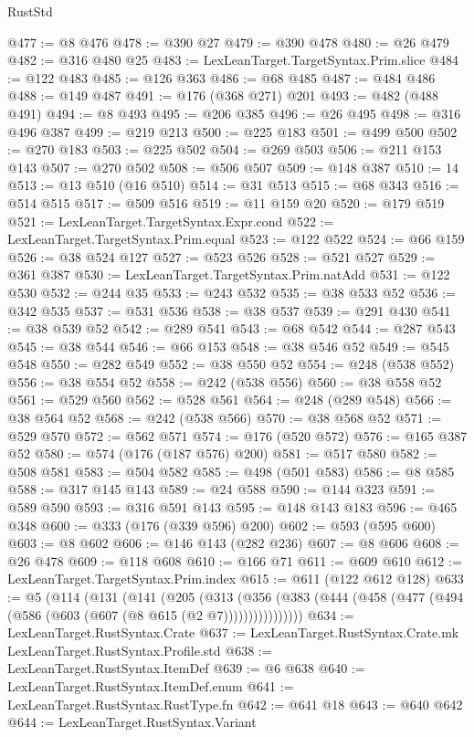 \begin{lexlean}{RustStd}
\begin{coremodule}
@477 := @8 @476
@478 := @390 @27
@479 := @390 @478
@480 := @26 @479
@482 := @316 @480 @25
@483 := LexLeanTarget.TargetSyntax.Prim.slice
@484 := @122 @483
@485 := @126 @363
@486 := @68 @485
@487 := @484 @486
@488 := @149 @487
@491 := @176 (@368 @271) @201
@493 := @482 (@488 @491)
@494 := @8 @493
@495 := @206 @385
@496 := @26 @495
@498 := @316 @496 @387
@499 := @219 @213
@500 := @225 @183
@501 := @499 @500
@502 := @270 @183
@503 := @225 @502
@504 := @269 @503
@506 := @211 @153 @143
@507 := @270 @502
@508 := @506 @507
@509 := @148 @387
@510 := 14
@513 := @13 @510 (@16 @510)
@514 := @31 @513
@515 := @68 @343
@516 := @514 @515
@517 := @509 @516
@519 := @11 @159 @20
@520 := @179 @519
@521 := LexLeanTarget.TargetSyntax.Expr.cond
@522 := LexLeanTarget.TargetSyntax.Prim.equal
@523 := @122 @522
@524 := @66 @159
@526 := @38 @524 @127
@527 := @523 @526
@528 := @521 @527
@529 := @361 @387
@530 := LexLeanTarget.TargetSyntax.Prim.natAdd
@531 := @122 @530
@532 := @244 @35
@533 := @243 @532
@535 := @38 @533 @52
@536 := @342 @535
@537 := @531 @536
@538 := @38 @537
@539 := @291 @430
@541 := @38 @539 @52
@542 := @289 @541
@543 := @68 @542
@544 := @287 @543
@545 := @38 @544
@546 := @66 @153
@548 := @38 @546 @52
@549 := @545 @548
@550 := @282 @549
@552 := @38 @550 @52
@554 := @248 (@538 @552)
@556 := @38 @554 @52
@558 := @242 (@538 @556)
@560 := @38 @558 @52
@561 := @529 @560
@562 := @528 @561
@564 := @248 (@289 @548)
@566 := @38 @564 @52
@568 := @242 (@538 @566)
@570 := @38 @568 @52
@571 := @529 @570
@572 := @562 @571
@574 := @176 (@520 @572)
@576 := @165 @387 @52
@580 := @574 (@176 (@187 @576) @200)
@581 := @517 @580
@582 := @508 @581
@583 := @504 @582
@585 := @498 (@501 @583)
@586 := @8 @585
@588 := @317 @145 @143
@589 := @24 @588
@590 := @144 @323
@591 := @589 @590
@593 := @316 @591 @143
@595 := @148 @143 @183
@596 := @465 @348
@600 := @333 (@176 (@339 @596) @200)
@602 := @593 (@595 @600)
@603 := @8 @602
@606 := @146 @143 (@282 @236)
@607 := @8 @606
@608 := @26 @478
@609 := @118 @608
@610 := @166 @71
@611 := @609 @610
@612 := LexLeanTarget.TargetSyntax.Prim.index
@615 := @611 (@122 @612 @128)
@633 := @5
    (@114
      (@131
        (@141
          (@205
            (@313
              (@356 (@383 (@444 (@458 (@477 (@494 (@586 (@603 (@607 (@8 @615 (@2 @7))))))))))))))))
@634 := LexLeanTarget.RustSyntax.Crate
@637 := LexLeanTarget.RustSyntax.Crate.mk LexLeanTarget.RustSyntax.Profile.std
@638 := LexLeanTarget.RustSyntax.ItemDef
@639 := @6 @638
@640 := LexLeanTarget.RustSyntax.ItemDef.enum
@641 := LexLeanTarget.RustSyntax.RustType.fn
@642 := @641 @18
@643 := @640 @642
@644 := LexLeanTarget.RustSyntax.Variant

\end{coremodule}
\end{lexlean}
